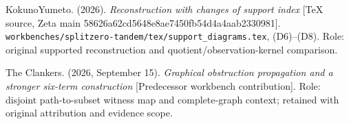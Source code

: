 KokunoYumeto. (2026). \emph{Reconstruction with changes of support index} {[}TeX source, Zeta main 58626a62cd5648e8ae7450fb54d4a4aab2330981{]}. \nolinkurl{workbenches/splitzero-tandem/tex/support_diagrams.tex}, (D6)--(D8). Role: original supported reconstruction and quotient/observation-kernel comparison.

The Clankers. (2026, September 15). \emph{Graphical obstruction propagation and a stronger six-term construction} {[}Predecessor workbench contribution{]}. Role: disjoint path-to-subset witness map and complete-graph context; retained with original attribution and evidence scope.
